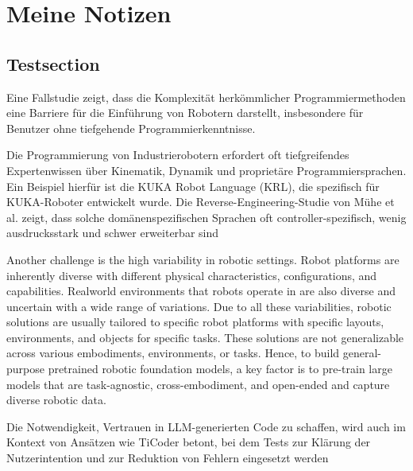 \chapter{Meine Notizen}
\label{cap:Meine Notizen}

\section{Testsection}
\label{sec:Testsection}

Eine Fallstudie zeigt, dass die Komplexität herkömmlicher Programmiermethoden eine Barriere für die Einführung von Robotern darstellt, insbesondere für Benutzer ohne tiefgehende Programmierkenntnisse.\cite{bhat2024groundingllmsrobottask}

Die Programmierung von Industrierobotern erfordert oft tiefgreifendes Expertenwissen über Kinematik, Dynamik und proprietäre Programmiersprachen. Ein Beispiel hierfür ist die KUKA Robot Language (KRL), die spezifisch für KUKA-Roboter entwickelt wurde. Die Reverse-Engineering-Studie von Mühe et al. zeigt, dass solche domänenspezifischen Sprachen oft controller-spezifisch, wenig ausdrucksstark und schwer erweiterbar sind \cite{mühe2010reverseengineeringkukarobotlanguage}

Another challenge is the high variability in robotic settings. Robot platforms are inherently diverse with different
physical characteristics, configurations, and capabilities. Realworld environments that robots operate in are also diverse
and uncertain with a wide range of variations. Due to all
these variabilities, robotic solutions are usually tailored to
specific robot platforms with specific layouts, environments,
and objects for specific tasks. These solutions are not generalizable across various embodiments, environments, or tasks.
Hence, to build general-purpose pretrained robotic foundation
models, a key factor is to pre-train large models that are
task-agnostic, cross-embodiment, and open-ended and capture
diverse robotic data.  \cite{firoozi2023foundationmodelsroboticsapplications}

Die Notwendigkeit, Vertrauen in LLM-generierten Code zu schaffen, wird auch im Kontext von Ansätzen wie TiCoder betont, bei dem Tests zur Klärung der Nutzerintention und zur Reduktion von Fehlern eingesetzt werden  \cite{Fakhoury_2024}
